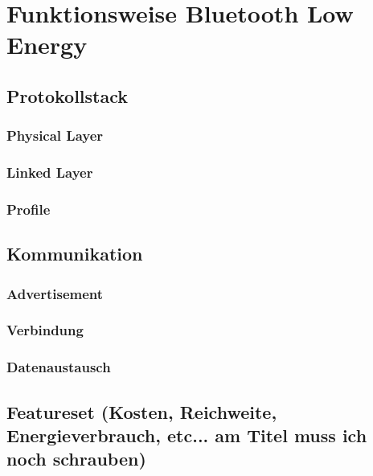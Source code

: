 \section{Funktionsweise Bluetooth Low Energy}
\label{s:funktionsweise}

\subsection{Protokollstack}
\label{ss:funktionsweise:protokollstack}

\subsubsection{Physical Layer}
\label{sss:funktionsweise:physical}

\subsubsection{Linked Layer}
\label{sss:funktionsweise:linked}

\subsubsection{Profile}
\label{sss:funktionsweise:profiles}

\subsection{Kommunikation}
\label{ss:funktionsweise:kommunkation}

\subsubsection{Advertisement}
\label{sss:funktionsweise:advertisement}

\subsubsection{Verbindung}
\label{sss:funktionsweise:verbindung}

\subsubsection{Datenaustausch}
\label{sss:funktionsweise:datenaustausch}

\subsection{Featureset (Kosten, Reichweite, Energieverbrauch, etc... am Titel muss ich noch schrauben)}
\label{ss:funktionsweise:Featureset}

